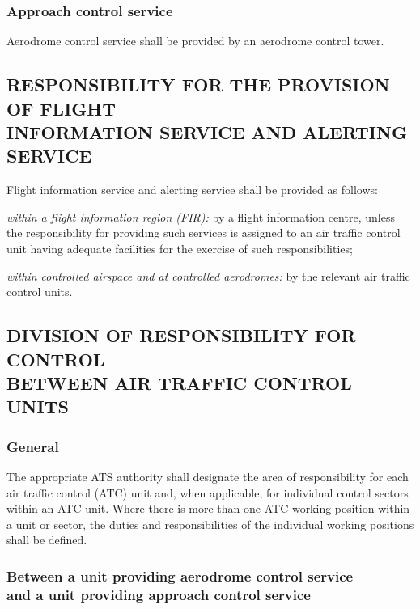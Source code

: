 \documentclass[../main.tex]{subfiles}
\begin{document}
    \subsubsection{Approach control service}

    Aerodrome control service shall be provided by an aerodrome control tower.

   \subsection[Responsibility for the provision of flight information service and alerting service]{RESPONSIBILITY FOR THE PROVISION OF FLIGHT \\ INFORMATION SERVICE AND ALERTING SERVICE}

    Flight information service and alerting service shall be provided as follows:
    \begin{enumalph}
        \item \textit{within a flight information region (FIR):} by a flight information centre, unless the responsibility for providing such services is assigned to an air traffic control unit having adequate facilities for the exercise of such responsibilities;
        \item \textit{within controlled airspace and at controlled aerodromes:} by the relevant air traffic control units.
    \end{enumalph}
    
    \subsection[Division of responsibility for control between air traffic control units]{DIVISION OF RESPONSIBILITY FOR CONTROL \\ BETWEEN AIR TRAFFIC CONTROL UNITS}
    
    \subsubsection{General}

    The appropriate ATS authority shall designate the area of responsibility for each air traffic control (ATC) unit and, when applicable, for individual control sectors within an ATC unit. Where there is more than one ATC working position within a unit or sector, the duties and responsibilities of the individual working positions shall be defined.

    \subsubsection[Between a unit providing aerodrome control service and a unit providing approach control service]{Between a unit providing aerodrome control service \\ and a unit providing approach control service}
\end{document}
